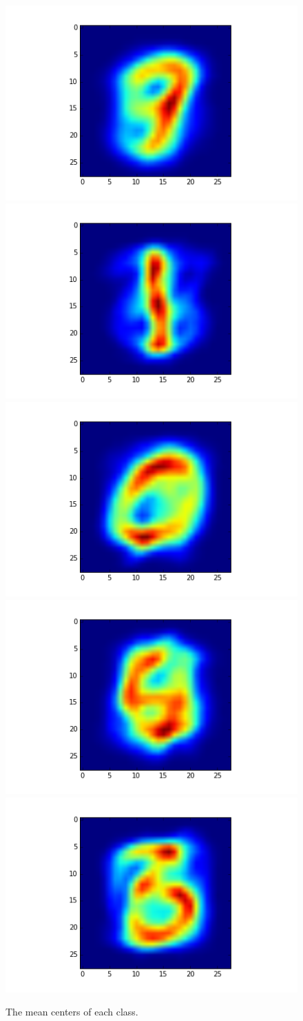 \documentclass[letter]{article}
\newenvironment{menumerate}{%
  \edef\backupindent{\the\parindent}%
  \enumerate%
  \setlength{\parindent}{\backupindent}%
}{\endenumerate}
\begin{document}
\begin{menumerate}
\begin{menumerate}
\begin{figure}
{      \includegraphics[height=0.3\textwidth]{class5.png}
      \includegraphics[height=0.3\textwidth]{class6.png}
      \includegraphics[height=0.3\textwidth]{class7.png}
      \includegraphics[height=0.3\textwidth]{class8.png}
      \includegraphics[height=0.3\textwidth]{class9.png}
        \caption{The mean centers of each class.}
      }


\end{figure}
\end{menumerate}
\end{menumerate}
\end{document}
